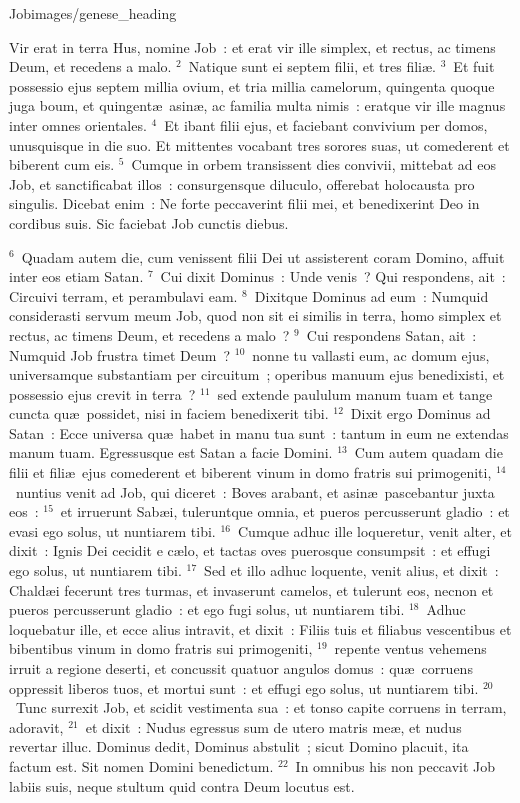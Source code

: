 {Job}{images/genese_heading}


\lettrine[lines=6,image=true,loversize=0.05,lraise=-0.03]{V}{}ir erat in terra Hus, nomine Job~: et erat vir ille simplex, et rectus, ac timens Deum, et recedens a malo.
${}^{2}$~Natique sunt ei septem filii, et tres fili\ae .
${}^{3}$~Et fuit possessio ejus septem millia ovium, et tria millia camelorum, quingenta quoque juga boum, et quingent\ae\ asin\ae , ac familia multa nimis~: eratque vir ille magnus inter omnes orientales.
${}^{4}$~Et ibant filii ejus, et faciebant convivium per domos, unusquisque in die suo. Et mittentes vocabant tres sorores suas, ut comederent et biberent cum eis.
${}^{5}$~Cumque in orbem transissent dies convivii, mittebat ad eos Job, et sanctificabat illos~: consurgensque diluculo, offerebat holocausta pro singulis. Dicebat enim~: Ne forte peccaverint filii mei, et benedixerint Deo in cordibus suis. Sic faciebat Job cunctis diebus.


${}^{6}$~Quadam autem die, cum venissent filii Dei ut assisterent coram Domino, affuit inter eos etiam Satan.
${}^{7}$~Cui dixit Dominus~: Unde venis~? Qui respondens, ait~: Circuivi terram, et perambulavi eam.
${}^{8}$~Dixitque Dominus ad eum~: Numquid considerasti servum meum Job, quod non sit ei similis in terra, homo simplex et rectus, ac timens Deum, et recedens a malo~?
${}^{9}$~Cui respondens Satan, ait~: Numquid Job frustra timet Deum~?
${}^{10}$~nonne tu vallasti eum, ac domum ejus, universamque substantiam per circuitum~; operibus manuum ejus benedixisti, et possessio ejus crevit in terra~?
${}^{11}$~sed extende paululum manum tuam et tange cuncta qu\ae\ possidet, nisi in faciem benedixerit tibi.
${}^{12}$~Dixit ergo Dominus ad Satan~: Ecce universa qu\ae\ habet in manu tua sunt~: tantum in eum ne extendas manum tuam. Egressusque est Satan a facie Domini.
${}^{13}$~Cum autem quadam die filii et fili\ae\ ejus comederent et biberent vinum in domo fratris sui primogeniti,
${}^{14}$~nuntius venit ad Job, qui diceret~: Boves arabant, et asin\ae\ pascebantur juxta eos~:
${}^{15}$~et irruerunt Sab\ae i, tuleruntque omnia, et pueros percusserunt gladio~: et evasi ego solus, ut nuntiarem tibi.
${}^{16}$~Cumque adhuc ille loqueretur, venit alter, et dixit~: Ignis Dei cecidit e c\ae lo, et tactas oves puerosque consumpsit~: et effugi ego solus, ut nuntiarem tibi.
${}^{17}$~Sed et illo adhuc loquente, venit alius, et dixit~: Chald\ae i fecerunt tres turmas, et invaserunt camelos, et tulerunt eos, necnon et pueros percusserunt gladio~: et ego fugi solus, ut nuntiarem tibi.
${}^{18}$~Adhuc loquebatur ille, et ecce alius intravit, et dixit~: Filiis tuis et filiabus vescentibus et bibentibus vinum in domo fratris sui primogeniti,
${}^{19}$~repente ventus vehemens irruit a regione deserti, et concussit quatuor angulos domus~: qu\ae\ corruens oppressit liberos tuos, et mortui sunt~: et effugi ego solus, ut nuntiarem tibi.
${}^{20}$~Tunc surrexit Job, et scidit vestimenta sua~: et tonso capite corruens in terram, adoravit,
${}^{21}$~et dixit~: Nudus egressus sum de utero matris me\ae , et nudus revertar illuc. Dominus dedit, Dominus abstulit~; sicut Domino placuit, ita factum est. Sit nomen Domini benedictum.
${}^{22}$~In omnibus his non peccavit Job labiis suis, neque stultum quid contra Deum locutus est.

